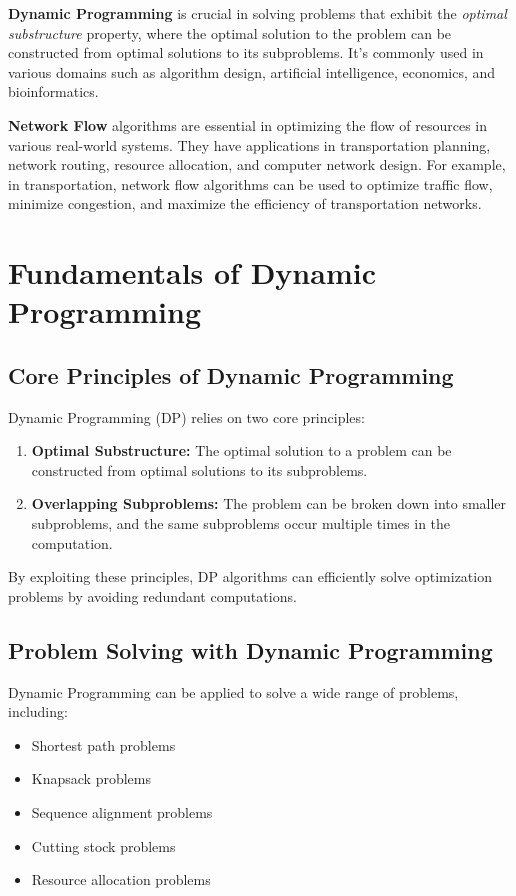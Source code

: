 \documentclass[12pt]{book} %
\begin{document}
\textbf{Dynamic Programming} is crucial in solving problems that exhibit the \textit{optimal substructure} property, where the optimal solution to the problem can be constructed from optimal solutions to its subproblems. It's commonly used in various domains such as algorithm design, artificial intelligence, economics, and bioinformatics.

\textbf{Network Flow} algorithms are essential in optimizing the flow of resources in various real-world systems. They have applications in transportation planning, network routing, resource allocation, and computer network design. For example, in transportation, network flow algorithms can be used to optimize traffic flow, minimize congestion, and maximize the efficiency of transportation networks.


\section{Fundamentals of Dynamic Programming}

\subsection{Core Principles of Dynamic Programming}
Dynamic Programming (DP) relies on two core principles:

\begin{enumerate}
    \item \textbf{Optimal Substructure:} The optimal solution to a problem can be constructed from optimal solutions to its subproblems.
    \item \textbf{Overlapping Subproblems:} The problem can be broken down into smaller subproblems, and the same subproblems occur multiple times in the computation.
\end{enumerate}

By exploiting these principles, DP algorithms can efficiently solve optimization problems by avoiding redundant computations.

\subsection{Problem Solving with Dynamic Programming}
Dynamic Programming can be applied to solve a wide range of problems, including:
\begin{itemize}
    \item Shortest path problems
    \item Knapsack problems
    \item Sequence alignment problems
    \item Cutting stock problems
    \item Resource allocation problems
\end{itemize}
\end{document}

